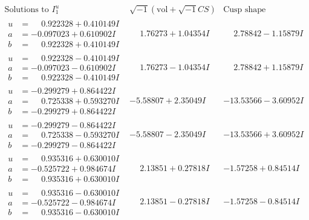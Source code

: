 \documentclass[1p]{elsarticle_modified}
\theoremstyle{definition}
\newcommand{\I}{\sqrt{-1}}
\begin{document}
$$\begin{array}{c|c|c}  
\text{Solutions to }I^u_{1}& \I (\text{vol} + \sqrt{-1}CS) & \text{Cusp shape}\\
 \hline 
\begin{aligned}
u &= \phantom{-}0.922328 + 0.410149 I \\
a &= -0.097023 + 0.610902 I \\
b &= \phantom{-}0.922328 + 0.410149 I\end{aligned}
 & \phantom{-}1.76273 + 1.04354 I & \phantom{-}2.78842 - 1.15879 I \\ \hline\begin{aligned}
u &= \phantom{-}0.922328 - 0.410149 I \\
a &= -0.097023 - 0.610902 I \\
b &= \phantom{-}0.922328 - 0.410149 I\end{aligned}
 & \phantom{-}1.76273 - 1.04354 I & \phantom{-}2.78842 + 1.15879 I \\ \hline\begin{aligned}
u &= -0.299279 + 0.864422 I \\
a &= \phantom{-}0.725338 + 0.593270 I \\
b &= -0.299279 + 0.864422 I\end{aligned}
 & -5.58807 + 2.35049 I & -13.53566 - 3.60952 I \\ \hline\begin{aligned}
u &= -0.299279 - 0.864422 I \\
a &= \phantom{-}0.725338 - 0.593270 I \\
b &= -0.299279 - 0.864422 I\end{aligned}
 & -5.58807 - 2.35049 I & -13.53566 + 3.60952 I \\ \hline\begin{aligned}
u &= \phantom{-}0.935316 + 0.630010 I \\
a &= -0.525722 + 0.984674 I \\
b &= \phantom{-}0.935316 + 0.630010 I\end{aligned}
 & \phantom{-}2.13851 + 0.27818 I & -1.57258 + 0.84514 I \\ \hline\begin{aligned}
u &= \phantom{-}0.935316 - 0.630010 I \\
a &= -0.525722 - 0.984674 I \\
b &= \phantom{-}0.935316 - 0.630010 I\end{aligned}
 & \phantom{-}2.13851 - 0.27818 I & -1.57258 - 0.84514 I \\ \hline\begin{aligned}

\end{aligned}
\end{array}$$
\end{document}
